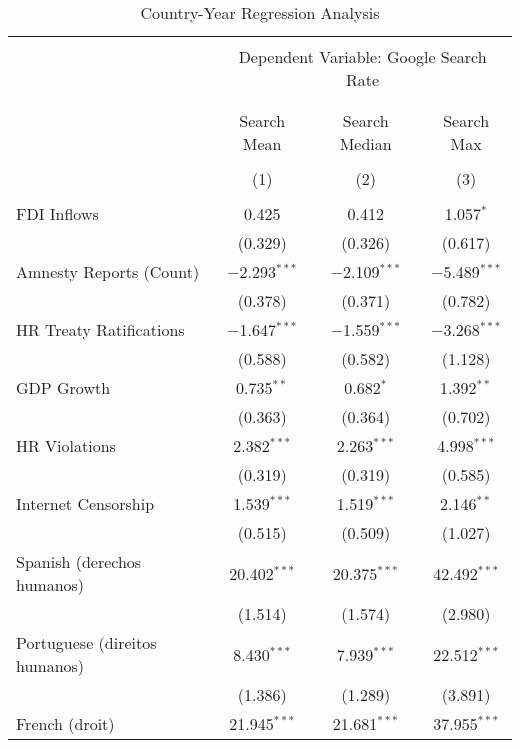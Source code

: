 
\begin{table}[!htbp] \centering 
  \caption{Country-Year Regression Analysis} 
  \label{} 
\begin{tabular}{@{\extracolsep{5pt}}lccc} 
\\[-1.8ex]\hline 
\hline \\[-1.8ex] 
 & \multicolumn{3}{c}{Dependent Variable: Google Search Rate} \\ 
\cline{2-4} 
\\[-1.8ex] & \multicolumn{3}{c}{ } \\ 
 & Search Mean & Search Median & Search Max \\ 
\\[-1.8ex] & (1) & (2) & (3)\\ 
\hline \\[-1.8ex] 
 FDI Inflows & 0.425 & 0.412 & 1.057$^{*}$ \\ 
  & (0.329) & (0.326) & (0.617) \\ 
  Amnesty Reports (Count) & $-$2.293$^{***}$ & $-$2.109$^{***}$ & $-$5.489$^{***}$ \\ 
  & (0.378) & (0.371) & (0.782) \\ 
  HR Treaty Ratifications & $-$1.647$^{***}$ & $-$1.559$^{***}$ & $-$3.268$^{***}$ \\ 
  & (0.588) & (0.582) & (1.128) \\ 
  GDP Growth & 0.735$^{**}$ & 0.682$^{*}$ & 1.392$^{**}$ \\ 
  & (0.363) & (0.364) & (0.702) \\ 
  HR Violations & 2.382$^{***}$ & 2.263$^{***}$ & 4.998$^{***}$ \\ 
  & (0.319) & (0.319) & (0.585) \\ 
  Internet Censorship & 1.539$^{***}$ & 1.519$^{***}$ & 2.146$^{**}$ \\ 
  & (0.515) & (0.509) & (1.027) \\ 
  Spanish (derechos humanos) & 20.402$^{***}$ & 20.375$^{***}$ & 42.492$^{***}$ \\ 
  & (1.514) & (1.574) & (2.980) \\ 
  Portuguese (direitos humanos) & 8.430$^{***}$ & 7.939$^{***}$ & 22.512$^{***}$ \\ 
  & (1.386) & (1.289) & (3.891) \\ 
  French (droit) & 21.945$^{***}$ & 21.681$^{***}$ & 37.955$^{***}$ \\ 

\end{tabular}
\end{table}
